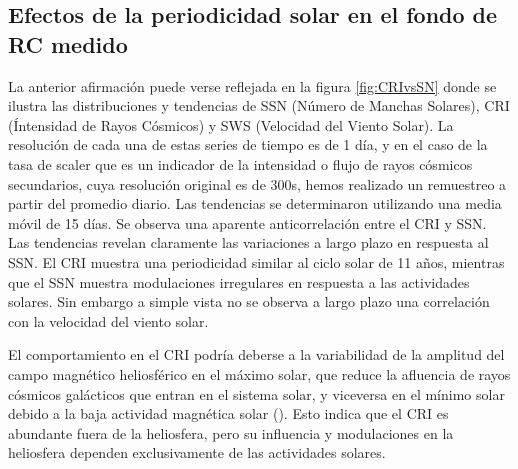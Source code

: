 \subsection{Efectos de la periodicidad solar en el fondo de RC medido}

La anterior afirmación puede verse reflejada en la figura \ref{fig:CRIvsSN} donde se ilustra  las distribuciones y tendencias de SSN (Número de Manchas Solares), CRI (Íntensidad de Rayos Cósmicos) y SWS (Velocidad del Viento Solar). La resolución de cada una de estas series de tiempo es de 1 día, y en el caso de la tasa de scaler que es un indicador de la intensidad o flujo de rayos cósmicos secundarios, cuya resolución original es de 300s, hemos realizado un remuestreo a partir del promedio diario. Las tendencias se determinaron utilizando una media móvil de 15 días. Se observa una aparente anticorrelación entre el CRI y SSN. Las tendencias revelan claramente las variaciones a largo plazo en respuesta al SSN. El CRI muestra una periodicidad similar al ciclo solar de 11 años, mientras que el SSN muestra modulaciones irregulares en respuesta a las actividades solares. Sin embargo a simple vista no se observa a largo plazo una correlación con la velocidad del viento solar.

El comportamiento en el CRI podría deberse a la variabilidad de la amplitud del campo magnético heliosférico en el máximo solar, que reduce la afluencia de rayos cósmicos galácticos que entran en el sistema solar, y viceversa en el mínimo solar debido a la baja actividad magnética solar (\cite{Oloketuyi_2020}). Esto indica que el CRI es abundante fuera de la heliosfera, pero su influencia y modulaciones en la heliosfera dependen exclusivamente de las actividades solares.


